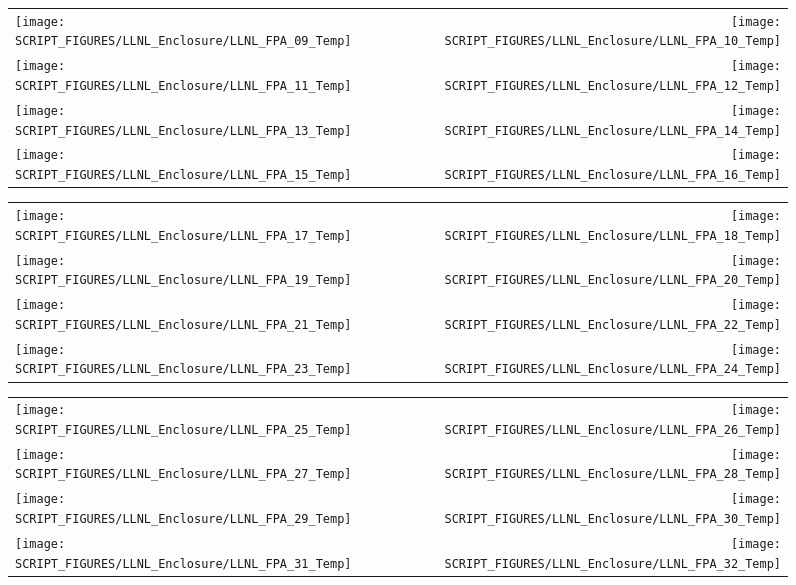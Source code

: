 \begin{figure}[p]
\begin{tabular*}{\textwidth}{l@{\extracolsep{\fill}}r}
\texttt{[image: SCRIPT\_FIGURES/LLNL\_Enclosure/LLNL\_FPA\_09\_Temp]} &
\texttt{[image: SCRIPT\_FIGURES/LLNL\_Enclosure/LLNL\_FPA\_10\_Temp]} \\
\texttt{[image: SCRIPT\_FIGURES/LLNL\_Enclosure/LLNL\_FPA\_11\_Temp]} &
\texttt{[image: SCRIPT\_FIGURES/LLNL\_Enclosure/LLNL\_FPA\_12\_Temp]} \\
\texttt{[image: SCRIPT\_FIGURES/LLNL\_Enclosure/LLNL\_FPA\_13\_Temp]} &
\texttt{[image: SCRIPT\_FIGURES/LLNL\_Enclosure/LLNL\_FPA\_14\_Temp]} \\
\texttt{[image: SCRIPT\_FIGURES/LLNL\_Enclosure/LLNL\_FPA\_15\_Temp]} &
\texttt{[image: SCRIPT\_FIGURES/LLNL\_Enclosure/LLNL\_FPA\_16\_Temp]}
\end{tabular*}
\end{figure}

\begin{figure}[p]
\begin{tabular*}{\textwidth}{l@{\extracolsep{\fill}}r}
\texttt{[image: SCRIPT\_FIGURES/LLNL\_Enclosure/LLNL\_FPA\_17\_Temp]} &
\texttt{[image: SCRIPT\_FIGURES/LLNL\_Enclosure/LLNL\_FPA\_18\_Temp]} \\
\texttt{[image: SCRIPT\_FIGURES/LLNL\_Enclosure/LLNL\_FPA\_19\_Temp]} &
\texttt{[image: SCRIPT\_FIGURES/LLNL\_Enclosure/LLNL\_FPA\_20\_Temp]} \\
\texttt{[image: SCRIPT\_FIGURES/LLNL\_Enclosure/LLNL\_FPA\_21\_Temp]} &
\texttt{[image: SCRIPT\_FIGURES/LLNL\_Enclosure/LLNL\_FPA\_22\_Temp]} \\
\texttt{[image: SCRIPT\_FIGURES/LLNL\_Enclosure/LLNL\_FPA\_23\_Temp]} &
\texttt{[image: SCRIPT\_FIGURES/LLNL\_Enclosure/LLNL\_FPA\_24\_Temp]}
\end{tabular*}
\end{figure}

\begin{figure}[p]
\begin{tabular*}{\textwidth}{l@{\extracolsep{\fill}}r}
\texttt{[image: SCRIPT\_FIGURES/LLNL\_Enclosure/LLNL\_FPA\_25\_Temp]} &
\texttt{[image: SCRIPT\_FIGURES/LLNL\_Enclosure/LLNL\_FPA\_26\_Temp]} \\
\texttt{[image: SCRIPT\_FIGURES/LLNL\_Enclosure/LLNL\_FPA\_27\_Temp]} &
\texttt{[image: SCRIPT\_FIGURES/LLNL\_Enclosure/LLNL\_FPA\_28\_Temp]} \\
\texttt{[image: SCRIPT\_FIGURES/LLNL\_Enclosure/LLNL\_FPA\_29\_Temp]} &
\texttt{[image: SCRIPT\_FIGURES/LLNL\_Enclosure/LLNL\_FPA\_30\_Temp]} \\
\texttt{[image: SCRIPT\_FIGURES/LLNL\_Enclosure/LLNL\_FPA\_31\_Temp]} &
\texttt{[image: SCRIPT\_FIGURES/LLNL\_Enclosure/LLNL\_FPA\_32\_Temp]}
\end{tabular*}
\end{figure}

